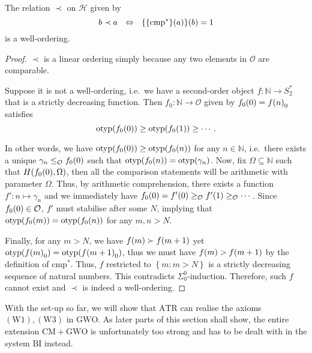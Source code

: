 \documentclass[11pt]{article}
\theoremstyle{plain}
\theoremstyle{definition}
\DeclareMathOperator{\otyp}{otyp}
\begin{document}
\begin{proposition}
    \label{prop:hyperarithmetic-indices-wo}
    The relation $\prec$ on $\mathcal{H}$ given by
    \[b \prec a \ \ \ratio\Leftrightarrow \ \ \mleft\{\mleft\{\mathrm{cmp}^*\mright\}\mleft(a\mright)\mright\}\mleft(b\mright) = 1\]
    is a well-ordering.
\end{proposition}

\begin{proof}
    $\prec$ is a linear ordering simply because any two elements in $\mathcal{O}$ are comparable.

    Suppose it is not a well-ordering, i.e.\ we have a second-order object $f : \mathbb{N} \rightarrow S_2^*$ that is a strictly decreasing function. Then $f_0 : \mathbb{N} \rightarrow \mathcal{O}$ given by $f_0\mleft(0\mright) = f\mleft(n\mright)_0$ satisfies
    \[\otyp\mleft(f_0\mleft(0\mright)\mright) \geq \otyp\mleft(f_0\mleft(1\mright)\mright) \geq \cdots.\]

    In other words, we have $\otyp\mleft(f_0\mleft(0\mright)\mright) \geq \otyp\mleft(f_0\mleft(n\mright)\mright)$ for any $n \in \mathbb{N}$, i.e.\ there exists a unique $\gamma_n \leq_\mathcal{O} f_0\mleft(0\mright)$ such that $\otyp\mleft(f_0\mleft(n\mright)\mright) = \otyp\mleft(\gamma_n\mright)$. Now, fix $\Omega \subseteq \mathbb{N}$ such that $H\mleft(f_0\mleft(0\mright), \Omega\mright)$, then all the comparison statements will be arithmetic with parameter $\Omega$. Thus, by arithmetic comprehension, there exists a function $f' : n \mapsto \gamma_n$ and we immediately have $f_0\mleft(0\mright) = f'\mleft(0\mright) \geq_\mathcal{O} f'\mleft(1\mright) \geq_\mathcal{O} \cdots$. Since $f_0\mleft(0\mright) \in \mathcal{O}$, $f'$ must stabilise after some $N$, implying that $\otyp\mleft(f_0\mleft(m\mright)\mright) = \otyp\mleft(f_0\mleft(n\mright)\mright)$ for any $m, n > N$.

    Finally, for any $m > N$, we have $f\mleft(m\mright) \succ f\mleft(m + 1\mright)$ yet $\otyp\mleft(f\mleft(m\mright)_0\mright) = \otyp\mleft(f\mleft(m + 1\mright)_0\mright)$, thus we must have $f\mleft(m\mright) > f\mleft(m + 1\mright)$ by the definition of $\mathrm{cmp}^*$. Thus, $f$ restricted to $\left\{m : m > N\right\}$ is a strictly decreasing sequence of natural numbers. This contradicts $\Sigma^0_0$-induction. Therefore, such $f$ cannot exist and $\prec$ is indeed a well-ordering.
\end{proof}

With the set-up so far, we will show that $\mathrm{ATR}$ can realise the axioms $\left(\mathrm{W}1\right), \left(\mathrm{W}3\right)$ in $\mathrm{GWO}$. As later parts of this section shall show, the entire extension $\mathrm{CM} + \mathrm{GWO}$ is unfortunately too strong and has to be dealt with in the system $\mathrm{BI}$ instead.
\end{document}
